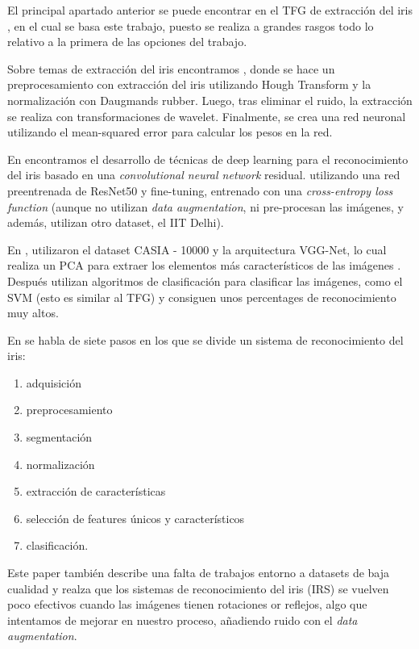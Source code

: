  \label{capitulo6}

El principal apartado anterior se puede  encontrar en el TFG de extracción del iris \cite{tfg_iris_2020}, en el cual se basa este trabajo, puesto se realiza a grandes rasgos
todo lo relativo a la primera de las opciones del trabajo.

Sobre temas de extracción del iris encontramos \cite{abdullah_iris_2015}, donde se hace un preprocesamiento con extracción del iris utilizando Hough Transform y la 
normalización con Daugmands rubber. Luego, tras eliminar el ruido, la extracción se realiza con transformaciones de wavelet. Finalmente, se crea una red neuronal
utilizando el mean-squared error para calcular los pesos en la red.

En \cite{minaee_deepiris_2019} encontramos el desarrollo de técnicas de deep learning para el reconocimiento del iris basado en una \textit{convolutional neural network} residual. utilizando una red preentrenada 
de ResNet50 y fine-tuning, entrenado con una \textit{cross-entropy loss function} (aunque no utilizan \textit{data augmentation}, ni pre-procesan las imágenes, y además, utilizan otro dataset, el IIT Delhi). 

En \cite{minaee_experimental_2017}, utilizaron el dataset CASIA - 10000 y la arquitectura VGG-Net, lo cual realiza un PCA para extraer los elementos
más característicos de las imágenes . Después utilizan algoritmos de clasificación para clasificar las imágenes, como el SVM (esto es similar al TFG) y consiguen unos percentages
de reconocimiento muy altos.

En \cite{malgheet_iris_2021} se habla de siete pasos en los que se divide un sistema de reconocimiento del iris:
\begin{enumerate}
\item adquisición
\item preprocesamiento
\item segmentación
\item normalización
\item extracción de características
\item selección de features únicos y característicos
\item clasificación. 
\end{enumerate}
 
 Este paper también describe una falta de
 trabajos entorno a datasets de baja cualidad y realza que los sistemas de reconocimiento del iris (IRS) se vuelven 
 poco efectivos cuando las imágenes tienen rotaciones or reflejos, algo que intentamos de mejorar en nuestro proceso, añadiendo ruido con el \textit{data augmentation}.

